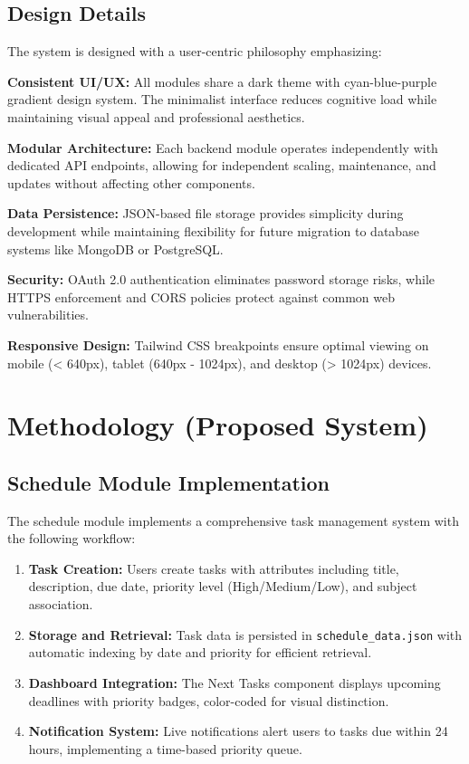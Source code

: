 \documentclass[12pt]{article}
\begin{document}
\subsection{Design Details}
The system is designed with a user-centric philosophy emphasizing:

\textbf{Consistent UI/UX:} All modules share a dark theme with cyan-blue-purple gradient design system. The minimalist interface reduces cognitive load while maintaining visual appeal and professional aesthetics.

\textbf{Modular Architecture:} Each backend module operates independently with dedicated API endpoints, allowing for independent scaling, maintenance, and updates without affecting other components.

\textbf{Data Persistence:} JSON-based file storage provides simplicity during development while maintaining flexibility for future migration to database systems like MongoDB or PostgreSQL.

\textbf{Security:} OAuth 2.0 authentication eliminates password storage risks, while HTTPS enforcement and CORS policies protect against common web vulnerabilities.

\textbf{Responsive Design:} Tailwind CSS breakpoints ensure optimal viewing on mobile (< 640px), tablet (640px - 1024px), and desktop (> 1024px) devices.

\section{Methodology (Proposed System)}
\subsection{Schedule Module Implementation}
The schedule module implements a comprehensive task management system with the following workflow:

\begin{enumerate}
    \item \textbf{Task Creation:} Users create tasks with attributes including title, description, due date, priority level (High/Medium/Low), and subject association.
    
    \item \textbf{Storage and Retrieval:} Task data is persisted in \texttt{schedule\_data.json} with automatic indexing by date and priority for efficient retrieval.
    
    \item \textbf{Dashboard Integration:} The Next Tasks component displays upcoming deadlines with priority badges, color-coded for visual distinction.
    
    \item \textbf{Notification System:} Live notifications alert users to tasks due within 24 hours, implementing a time-based priority queue.
\end{enumerate}
\end{document}
